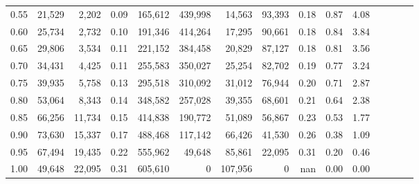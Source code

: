 \begin{tabular}{rrrcrrrrrrrrrrr}
0.55 &  21,529 &   2,202 &                                       0.09 &  165,612 &  439,998 &   14,563 &   93,393 &  0.18 &  0.87 &                         4.08 \\
0.60 &  25,734 &   2,732 &                                       0.10 &  191,346 &  414,264 &   17,295 &   90,661 &  0.18 &  0.84 &                         3.84 \\
0.65 &  29,806 &   3,534 &                                       0.11 &  221,152 &  384,458 &   20,829 &   87,127 &  0.18 &  0.81 &                         3.56 \\
0.70 &  34,431 &   4,425 &                                       0.11 &  255,583 &  350,027 &   25,254 &   82,702 &  0.19 &  0.77 &                         3.24 \\
0.75 &  39,935 &   5,758 &                                       0.13 &  295,518 &  310,092 &   31,012 &   76,944 &  0.20 &  0.71 &                         2.87 \\
0.80 &  53,064 &   8,343 &                                       0.14 &  348,582 &  257,028 &   39,355 &   68,601 &  0.21 &  0.64 &                         2.38 \\
0.85 &  66,256 &  11,734 &                                       0.15 &  414,838 &  190,772 &   51,089 &   56,867 &  0.23 &  0.53 &                         1.77 \\
0.90 &  73,630 &  15,337 &                                       0.17 &  488,468 &  117,142 &   66,426 &   41,530 &  0.26 &  0.38 &                         1.09 \\
0.95 &  67,494 &  19,435 &                                       0.22 &  555,962 &   49,648 &   85,861 &   22,095 &  0.31 &  0.20 &                         0.46 \\
1.00 &  49,648 &  22,095 &                                       0.31 &  605,610 &        0 &  107,956 &        0 &   nan &  0.00 &                         0.00 \\
\bottomrule
\end{tabular}
